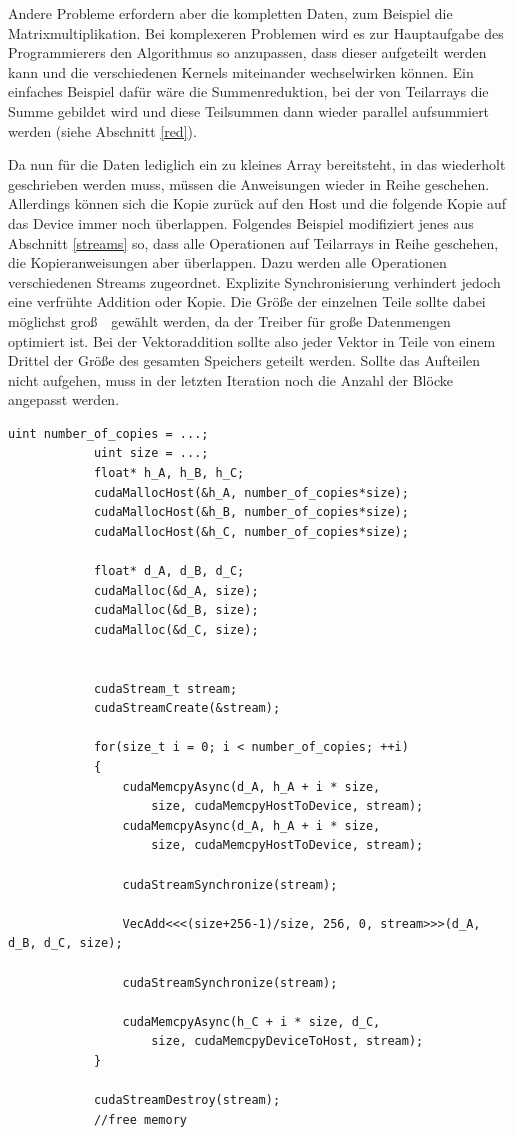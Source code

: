 		Andere Probleme erfordern aber die kompletten Daten, zum Beispiel die Matrixmultiplikation. Bei komplexeren Problemen wird es zur Hauptaufgabe des Programmierers den Algorithmus so anzupassen, dass dieser aufgeteilt werden kann und die verschiedenen \Glspl{Kernel} miteinander wechselwirken können. Ein einfaches Beispiel dafür wäre die Summenreduktion, bei der von Teilarrays die Summe gebildet wird und diese Teilsummen dann wieder parallel aufsummiert werden (siehe Abschnitt \ref{red}). 
		
		Da nun für die Daten lediglich ein zu kleines Array bereitsteht, in das wiederholt geschrieben werden muss, müssen die Anweisungen wieder in Reihe geschehen. Allerdings können sich die Kopie zurück auf den Host und die folgende Kopie auf das Device immer noch überlappen. Folgendes Beispiel modifiziert jenes aus Abschnitt \ref{streams} so, dass alle Operationen auf Teilarrays in Reihe geschehen, die Kopieranweisungen aber überlappen. Dazu werden alle Operationen verschiedenen \Glspl{Stream} zugeordnet. Explizite Synchronisierung verhindert jedoch eine verfrühte Addition oder Kopie. Die Grö\ss e der einzelnen Teile sollte dabei möglichst gro\ss\ ~gewählt werden, da der Treiber für gro\ss e Datenmengen optimiert ist. Bei der Vektoraddition sollte also jeder Vektor in Teile von einem Drittel der Grö\ss e des gesamten Speichers geteilt werden. Sollte das Aufteilen nicht aufgehen, muss in der letzten Iteration noch die Anzahl der Blöcke angepasst werden.
		
		\begin{lstlisting}[caption=Datenaufteilung]
			uint number_of_copies = ...;
			uint size = ...;
			float* h_A, h_B, h_C;
			cudaMallocHost(&h_A, number_of_copies*size);
			cudaMallocHost(&h_B, number_of_copies*size);
			cudaMallocHost(&h_C, number_of_copies*size);
				
			float* d_A, d_B, d_C;
			cudaMalloc(&d_A, size);
			cudaMalloc(&d_B, size);
			cudaMalloc(&d_C, size);
			
			
			cudaStream_t stream;
			cudaStreamCreate(&stream);
			
			for(size_t i = 0; i < number_of_copies; ++i)
			{
				cudaMemcpyAsync(d_A, h_A + i * size,
					size, cudaMemcpyHostToDevice, stream);
				cudaMemcpyAsync(d_A, h_A + i * size,
					size, cudaMemcpyHostToDevice, stream);
					
				cudaStreamSynchronize(stream);
    			
				VecAdd<<<(size+256-1)/size, 256, 0, stream>>>(d_A, d_B, d_C, size);
				
				cudaStreamSynchronize(stream);
				
				cudaMemcpyAsync(h_C + i * size, d_C,
					size, cudaMemcpyDeviceToHost, stream);
			}
			
			cudaStreamDestroy(stream);
			//free memory
		\end{lstlisting}
		
